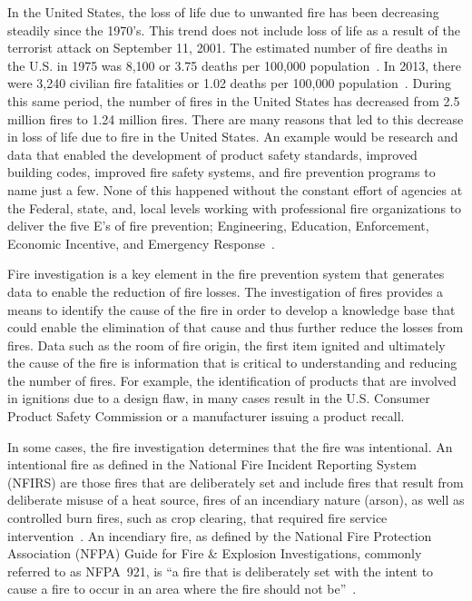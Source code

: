 \documentclass[twoside]{uocthesis}
\begin{document}
In the United States, the loss of life due to unwanted fire has been decreasing steadily since the 1970’s.  This trend does not include loss of life as a result of the terrorist attack on September 11, 2001.  The estimated number of fire deaths in the U.S. in 1975 was 8,100 or 3.75 deaths per 100,000 population~\cite{America_Burning_Revisited}.  In 2013, there were 3,240 civilian fire fatalities or 1.02 deaths per 100,000 population~\cite{Karter:2014}.  During this same period, the number of fires in the United States has decreased from 2.5 million fires to 1.24 million fires.  There are many reasons that led to this decrease in loss of life due to fire in the United States.  An example would be research and data that enabled the development of product safety standards, improved building codes, improved fire safety systems, and fire prevention programs to name just a few.  None of this happened without the constant effort of agencies at the Federal, state, and, local levels working with professional fire organizations to deliver the five E’s of fire prevention; Engineering, Education, Enforcement, Economic Incentive, and Emergency Response~\cite{FEMA:2013}.

Fire investigation is a key element in the fire prevention system that generates data to enable the reduction of fire losses.  The investigation of fires provides a means to identify the cause of the fire in order to develop a knowledge base that could enable the elimination of that cause and thus further reduce the losses from fires.  Data such as the room of fire origin, the first item ignited and ultimately the cause of the fire is information that is critical to understanding and reducing the number of fires.  For example, the identification of products that are involved in ignitions due to a design flaw, in many cases result in the U.S. Consumer Product Safety Commission or a manufacturer issuing a product recall.

In some cases, the fire investigation determines that the fire was intentional.  An intentional fire as defined in the National Fire Incident Reporting System (NFIRS)  are those fires that are deliberately set and include fires that result from deliberate misuse of a heat source, fires of an incendiary nature (arson), as well as controlled burn fires, such as crop clearing, that required fire service intervention~\cite{Campbell:2014}.  An incendiary fire, as defined by the National Fire Protection Association (NFPA) Guide for Fire \& Explosion Investigations, commonly referred to as NFPA~921, is ``a fire that is deliberately set with the intent to cause a fire to occur in an area where the fire should not be''~\cite{NFPA:921}.
\end{document}
